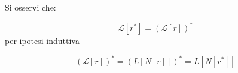{\begin{itemize}
\begin{center}
\begin{tikzpicture}
            \end{tikzpicture}            
        \end{center}

        Si osservi che:

        \[
            \mathcal{L}[r^*] = (\mathcal{L}[r])^* 
        \]
        per ipotesi induttiva

        \[
            (\mathcal{L}[r])^* = (L[N[r]])^* = L[N[r^*]]
        \]
    \end{itemize}
}
